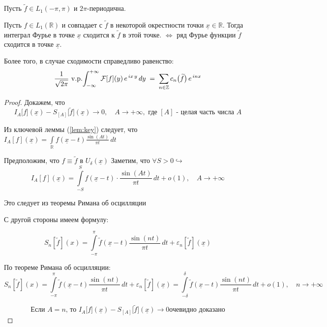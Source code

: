 \begin{theorem}
    Пусть \( \tilde{f} \in L_1(-\pi, \pi) \) и \(2\pi\)-периодична.

    Пусть \( f \in L_1(\mathbb{R}) \) и совпадает с \( \widetilde{f} \) в некоторой окрестности точки \( \underline{x} \in \mathbb{R} \). Тогда интеграл Фурье в точке \(\underline{x}\) сходится к \(\widetilde{f}\) в этой точке. \(\Leftrightarrow\) ряд Фурье функции \(\widetilde{f}\) сходится в точке \(\underline{x}\).

    Более того, в случае сходимости справедливо равенство:
\[
\frac{1}{\sqrt{2\pi}}\,\mathop{\mathrm{v.p.}}\!\int
_{-\infty}^{+\infty}
\mathcal{F}[f](y)\,e^{\,i x\,y}\,dy
\;=\;
\sum_{n\in\mathbb{Z}}
c_{n}\bigl(\widetilde{f}\bigr)\,e^{\,i n x}
\]
\end{theorem}


\begin{proof}

Докажем, что
\[
I_A \bigl[f\bigr](\underline{x}) - S_{[A]}\bigl[\widetilde{f}\bigr](\underline{x}) \longrightarrow 0, \quad A \to +\infty, \text{ где $[A]$ - целая часть числа $A$}
\]

Из ключевой леммы (\ref{lem:key}) следует, что $I_A[f](\underline{x}) = \int\limits_{\mathbb{R}} f(\underline{x} - t) \frac{\sin(At)}{\pi t} \, dt$

Предположим, что $f \equiv \widetilde{f}
    \text{ в } U_\delta(\underline{x})$
Заметим, что $\forall S > 0 \hookrightarrow$
\[
I_A \left[ f \right](\underline{x}) = \int\limits_{-S}^{S} f(\underline{x} - t) \cdot \frac{\sin(At)}{\pi t} \, dt + o(1), \quad A \to +\infty
\]

Это следует из теоремы Римана об осцилляции %


С другой стороны имеем формулу: %


\[
S_n \left[\widetilde{f}\right](x) = \int\limits_{-\pi}^{\pi} \widetilde{f}(\underline{x} - t) \frac{\sin(nt)}{\pi t} \, dt + \varepsilon_n \left[\widetilde{f}\right](\underline{x})
\]

По теореме Римана об осцилляции: %
\[
S_n \left[\widetilde{f}\right](x) = \int\limits_{-\pi}^{\pi} \widetilde{f}(\underline{x} - t) \frac{\sin(nt)}{\pi t} \, dt + \varepsilon_n \left[\widetilde{f}\right](\underline{x}) = \int\limits_{-\delta}^{\delta} \widetilde{f}(\underline{x} - t) \frac{\sin(nt)}{\pi t} \, dt + o(1), \quad n \rightarrow +\infty
\]


\[
\text{Если $A = n$, то }I_A \bigl[f\bigr](\underline{x}) - S_{[A]}\bigl[\widetilde{f}\bigr](\underline{x}) \longrightarrow 0 \text{
очевидно доказано}
\]


\end{proof}
